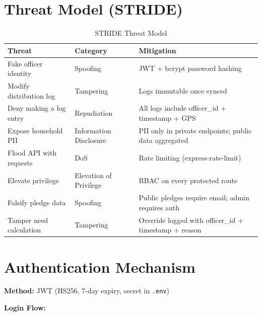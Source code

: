 
\section{Threat Model (STRIDE)}
\begin{table}[H]
\centering
\caption{STRIDE Threat Model}
\label{tab:stride}
\begin{tabularx}{\textwidth}{@{}llX@{}}
\toprule
Threat & Category & Mitigation \\
\midrule
Fake officer identity & Spoofing & JWT + bcrypt password hashing \\
Modify distribution log & Tampering & Logs immutable once synced \\
Deny making a log entry & Repudiation & All logs include officer\_id + timestamp + GPS \\
Expose household PII & Information Disclosure & PII only in private endpoints; public data aggregated \\
Flood API with requests & DoS & Rate limiting (express-rate-limit) \\
Elevate privilege & Elevation of Privilege & RBAC on every protected route \\
Falsify pledge data & Spoofing & Public pledges require email; admin requires auth \\
Tamper need calculation & Tampering & Override logged with officer\_id + timestamp + reason \\
\bottomrule
\end{tabularx}
\end{table}

\section{Authentication Mechanism}
\textbf{Method:} JWT (HS256, 7-day expiry, secret in \texttt{.env})

\textbf{Login Flow:}

